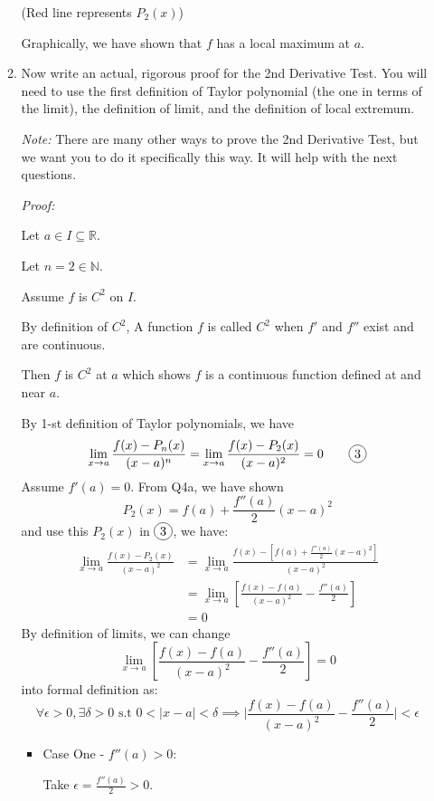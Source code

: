 \documentclass[12pt]{exam}
\newcommand{\R}{\mathbb{R}}
\newcommand{\N}{\mathbb{N}}
\newcommand*\circled[1]{\tikz[baseline=(char.base)]{
            \node[shape=circle,draw,inner sep=2pt] (char) {#1};}}
\begin{document}
\begin{enumerate}
\begin{enumerate}
\begin{center}
			    (Red line represents $P_2(x)$)
			\end{center}
			Graphically, we have shown that $f$ has a local maximum at $a$.
			
			\newpage
			
		\item  \label{qu:pf} Now write an actual, rigorous proof for the 2nd Derivative Test.  You will need to use the first definition of Taylor polynomial (the one in terms of the limit), the definition of limit, and the definition of local extremum.
				
			\emph{Note:}  There are many other ways to prove the 2nd Derivative Test, but we want you to do it specifically this way. It will help with the next questions.
			
			\emph{Proof:}
			
			Let $a \in I\subseteq\R$.
			
			Let $n=2\in\N$.
			
		    Assume $f$ is $C^2$ on $I$.
		    
		    By definition of $C^2$, A function $f$ is called $C^2$ when $f'$ and $f''$ exist and are continuous.
			
			Then $f$ is $C^2$ at $a$ which shows $f$ is a continuous function defined at and near $a$.
			
			By 1-st definition of Taylor polynomials, we have
			$$
			    \lim_{x\to a}\frac{f(x)-P_n(x)}{(x-a)^n}=\lim_{x\to a}\frac{f(x)-P_2(x)}{(x-a)^2}=0\qquad\circled{3}
			$$
			Assume $f'(a) = 0$. From Q4a, we have shown
			$$
			    P_2(x)=f(a)+\frac{f''(a)}{2}(x-a)^2
			$$
			and use this $P_2(x)$ in $\circled{3}$, we have:
			\begin{align*}
			    \lim_{x\to a}\frac{f(x)-P_2(x)}{(x-a)^2}
			    &=\lim_{x\to a}\frac{f(x)-[f(a)+\frac{f''(a)}{2}(x-a)^2]}{(x-a)^2}\\
			    &=\lim_{x\to a}[\frac{f(x)-f(a)}{(x-a)^2}-\frac{f''(a)}{2}]\\
			    &=0
			\end{align*}
			By definition of limits, we can change
			$$
			    \lim_{x\to a}[\frac{f(x)-f(a)}{(x-a)^2}-\frac{f''(a)}{2}]=0
			$$
			into formal definition as:
			$$
			    \forall\epsilon>0, \exists\delta>0 \mbox{ s.t } 0<\vert{x-a}\vert<\delta\implies\vert{\frac{f(x)-f(a)}{(x-a)^2}-\frac{f''(a)}{2}}\vert<\epsilon
			$$
			\begin{itemize}
			    \item Case One - $f''(a)>0$:
			        
			        Take $\epsilon=\frac{f''(a)}{2}>0$.
			        

\end{itemize}
\end{enumerate}
\end{enumerate}
\end{document}
